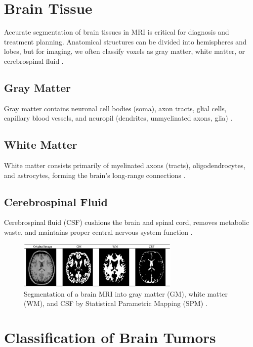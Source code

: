 \section{Brain Tissue}
Accurate segmentation of brain tissues in MRI is critical for diagnosis and treatment planning. Anatomical structures can be divided into hemispheres and lobes, but for imaging, we often classify voxels as gray matter, white matter, or cerebrospinal fluid \cite{ref1}.

\subsection{Gray Matter}
Gray matter contains neuronal cell bodies (soma), axon tracts, glial cells, capillary blood vessels, and neuropil (dendrites, unmyelinated axons, glia) \cite{ref5}.

\subsection{White Matter}
White matter consists primarily of myelinated axons (tracts), oligodendrocytes, and astrocytes, forming the brain’s long-range connections \cite{ref5}.

\subsection{Cerebrospinal Fluid}
Cerebrospinal fluid (CSF) cushions the brain and spinal cord, removes metabolic waste, and maintains proper central nervous system function \cite{ref6}.

\begin{figure}[ht]
  \centering
  \includegraphics[width=0.7\textwidth]{Images/Chapter0/parts.png}
  \caption{Segmentation of a brain MRI into gray matter (GM), white matter (WM), and CSF by Statistical Parametric Mapping (SPM) \cite{ref7}.}
  \label{fig:spm-segmentation}
\end{figure}

\section{Classification of Brain Tumors}
